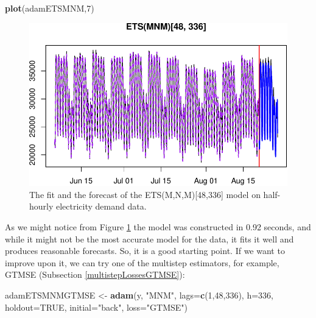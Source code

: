 \documentclass[]{book}
\newenvironment{Shaded}{\begin{snugshade}}{\end{snugshade}}
\newcommand{\DataTypeTok}[1]{\textcolor[rgb]{0.13,0.29,0.53}{#1}}
\newcommand{\DecValTok}[1]{\textcolor[rgb]{0.00,0.00,0.81}{#1}}
\newcommand{\KeywordTok}[1]{\textcolor[rgb]{0.13,0.29,0.53}{\textbf{#1}}}
\newcommand{\NormalTok}[1]{#1}
\newcommand{\OtherTok}[1]{\textcolor[rgb]{0.56,0.35,0.01}{#1}}
\newcommand{\StringTok}[1]{\textcolor[rgb]{0.31,0.60,0.02}{#1}}
\theoremstyle{definition}
\theoremstyle{definition}
\theoremstyle{definition}
\theoremstyle{definition}
\theoremstyle{remark}
\begin{document}
\begin{Shaded}
\begin{Highlighting}[]
\KeywordTok{plot}\NormalTok{(adamETSMNM,}\DecValTok{7}\NormalTok{)}
\end{Highlighting}
\end{Shaded}

\begin{figure}
\centering
\includegraphics{Svetunkov--2022----ADAM_files/figure-latex/adamModelETSMNM-1.pdf}
\caption{\label{fig:adamModelETSMNM}The fit and the forecast of the ETS(M,N,M){[}48,336{]} model on half-hourly electricity demand data.}
\end{figure}

As we might notice from Figure \ref{fig:adamModelETSMNM} the model was constructed in 0.92 seconds, and while it might not be the most accurate model for the data, it fits it well and produces reasonable forecasts. So, it is a good starting point. If we want to improve upon it, we can try one of the multistep estimators, for example, GTMSE (Subsection \ref{multistepLossesGTMSE}):

\begin{Shaded}
\begin{Highlighting}[]
\NormalTok{adamETSMNMGTMSE <-}\StringTok{ }\KeywordTok{adam}\NormalTok{(y, }\StringTok{"MNM"}\NormalTok{, }\DataTypeTok{lags=}\KeywordTok{c}\NormalTok{(}\DecValTok{1}\NormalTok{,}\DecValTok{48}\NormalTok{,}\DecValTok{336}\NormalTok{),}
                        \DataTypeTok{h=}\DecValTok{336}\NormalTok{, }\DataTypeTok{holdout=}\OtherTok{TRUE}\NormalTok{,}
                        \DataTypeTok{initial=}\StringTok{"back"}\NormalTok{, }\DataTypeTok{loss=}\StringTok{"GTMSE"}\NormalTok{)}
\end{Highlighting}
\end{Shaded}
\end{document}
